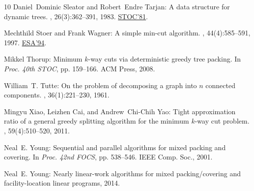 \documentclass[11pt]{article}
\numberwithin{equation}{section}
\theoremstyle{definition}
\theoremstyle{plain}
\begin{document}
\begin{thebibliography}{10}
{\sc Daniel~Dominic Sleator and Robert~Endre Tarjan}: A data structure for
  dynamic trees.
, 26(3):362--391, 1983.
\newblock \prelim \href{https://doi.org/10.1145/800076.802464}{STOC'81}.
\newblock [\epfmtdoi{10.1016/0022-0000(83)90006-5}]

{\sc Mechthild Stoer and Frank Wagner}: A simple min-cut algorithm.
, 44(4):585--591, 1997.
\newblock \prelim \href{https://doi.org/10.1007/BFb0049404}{ESA'94}.
\newblock [\epfmtdoi{10.1145/263867.263872}]

{\sc Mikkel Thorup}: Minimum $k$-way cuts via deterministic greedy tree
  packing.
\newblock In {\em Proc. 40th STOC}, pp. 159--166. ACM Press, 2008.
\newblock [\epfmtdoi{10.1145/1374376.1374402}]

{\sc William~T. Tutte}: On the problem of decomposing a graph into $n$
  connected components.
, 36(1):221--230, 1961.

{\sc Mingyu Xiao, Leizhen Cai, and Andrew~Chi{-}Chih Yao}: Tight approximation
  ratio of a general greedy splitting algorithm for the minimum $k$-way cut
  problem.
, 59(4):510--520, 2011.

{\sc Neal~E. Young}: Sequential and parallel algorithms for mixed packing and
  covering.
\newblock In {\em Proc. 42nd FOCS}, pp. 538--546. IEEE Comp. Soc., 2001.

{\sc Neal~E. Young}: Nearly linear-work algorithms for mixed packing/covering
  and facility-location linear programs, 2014.

\end{thebibliography}
\end{document}
